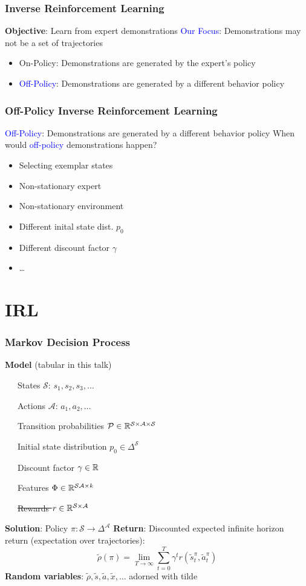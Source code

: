 \documentclass{beamer}
\begin{document}
\begin{frame}
	\frametitle{Inverse Reinforcement Learning}
	\textbf{Objective}: Learn from expert demonstrations
	\vfill
	\textcolor{blue}{Our Focus}: Demonstrations may not be a set of trajectories
	\begin{itemize}
		\item On-Policy: Demonstrations are generated by the expert's policy
		\item \textcolor{blue}{Off-Policy}: Demonstrations are generated by a different behavior policy
	\end{itemize}
\end{frame}

\begin{frame}
	\frametitle{Off-Policy Inverse Reinforcement Learning}
	\textcolor{blue}{Off-Policy}: Demonstrations are generated by a different behavior policy
	\vfill
	When would \textcolor{blue}{off-policy} demonstrations happen?
	\begin{itemize}
		\item Selecting exemplar states
		\item Non-stationary expert
		\item Non-stationary environment
		\item Different inital state dist. $p_0$
		\item Different discount factor $\gamma$
		\item \ldots
	\end{itemize}
\end{frame}



\section*{IRL}

\begin{frame} \frametitle{Markov Decision Process}
  \textbf{Model} (tabular in this talk) \par
    {\small
   ~~~States $\mathcal{S}$: $s_1, s_2, s_3, \dots $ \par
   ~~~Actions $\mathcal{A}$: $a_1, a_2, \dots $ \par
   ~~~Transition probabilities $\mathcal{P} \in \mathbb{R}^{\mathcal{S} \times \mathcal{A} \times \mathcal{S} }$ \par
   ~~~Initial state distribution $p_0 \in \Delta^\mathcal{S}$ \par
   ~~~Discount factor $\gamma \in \mathbb{R}$ \par
   ~~~Features $\Phi \in \mathbb{R}^{\mathcal{S} \mathcal{A} \times k}$ \par
   ~~~\sout{Rewards $r \in \mathbb{R}^{\mathcal{S} \times \mathcal{A}}$}}
    \vfill 
    \textbf{Solution}: Policy ${\pi}\colon \mathcal{S} \to \Delta^\mathcal{A}$
    \vfill
    \textbf{Return}: Discounted expected infinite horizon return (expectation over trajectories):
    \[
	    \tilde{\rho}(\pi) = \lim_{T \to \infty} \sum_{t=0}^T \gamma^t r(\tilde{s}^{\pi}_t, \tilde{a}^{{\pi}}_t)
    \]
    \vfill
    \textbf{Random variables}: $\tilde{\rho}, \tilde{s}, \tilde{a}, \tilde{x}, \dots $ adorned with tilde
\end{frame}
\end{document}
